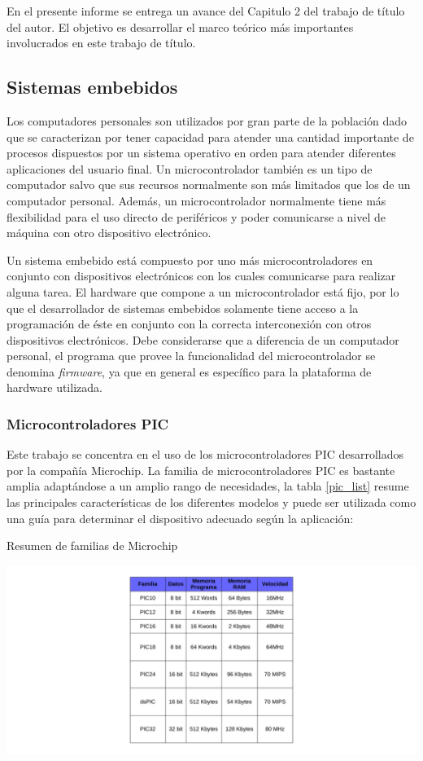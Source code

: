 \documentclass[11pt,letterpaper]{article}
\begin{document}
En el presente informe se entrega un avance del Capitulo 2 del trabajo de título del autor. El objetivo es desarrollar el marco teórico más importantes involucrados en este trabajo de título.

\subsection{Sistemas embebidos}
Los computadores personales son utilizados por gran parte de la población dado que se caracterizan por tener capacidad para atender una cantidad importante de procesos dispuestos por un sistema operativo en orden para atender diferentes aplicaciones  del usuario final. Un microcontrolador tambi\'en es un tipo de computador salvo que sus recursos normalmente son más limitados que los de un computador personal. Además, un microcontrolador normalmente tiene más flexibilidad para el uso directo de perif\'ericos y poder comunicarse a nivel de máquina con otro dispositivo electrónico.

Un sistema embebido está compuesto por uno más microcontroladores en conjunto con dispositivos electrónicos con los cuales comunicarse para realizar alguna tarea. 
El hardware que compone a un microcontrolador está fijo, por lo que el desarrollador de sistemas embebidos solamente tiene acceso a la programación de \'este en conjunto con la correcta interconexión con otros dispositivos electrónicos. Debe considerarse que a diferencia de un computador personal, el programa que provee la funcionalidad del microcontrolador se denomina \textit{firmware}, ya que en general es específico para la plataforma de hardware utilizada.

\subsubsection{Microcontroladores PIC}
Este trabajo se concentra en el uso de los microcontroladores PIC desarrollados por la compañía Microchip. La familia de microcontroladores  PIC es bastante amplia adaptándose a un amplio rango de necesidades, la tabla \ref{pic_list} resume las principales características de los diferentes modelos y puede ser utilizada como una guía para determinar el dispositivo adecuado según la aplicación:

\begin{table}[ht!]
\caption{Resumen de familias de Microchip}\label{pic_list}
\centering \includegraphics[width=\textwidth]{img/pic_list.pdf}
\end{table}
\end{document}
